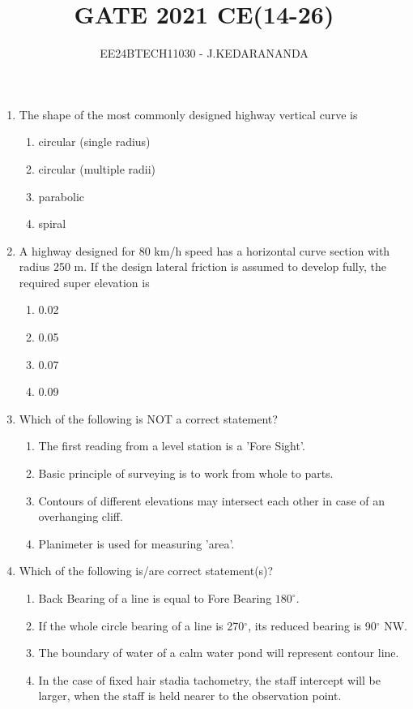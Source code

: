 \documentclass[journal]{IEEEtran}
\renewcommand{\thefigure}{\theenumi}
\renewcommand{\thetable}{\theenumi}
\numberwithin{equation}{enumi}
\numberwithin{figure}{enumi}
\renewcommand{\thetable}{\theenumi}
\begin{document}

\vspace{3cm}

\title{GATE 2021 CE(14-26)}
\author{EE24BTECH11030 - J.KEDARANANDA}
{\let\newpage\relax\maketitle}
\renewcommand{\thefigure}{\theenumi}
\renewcommand{\thetable}{\theenumi}
\begin{enumerate}
\item The shape of the most commonly designed highway vertical curve is
\begin{enumerate}
\item circular (single radius)
\item circular (multiple radii)
\item parabolic
\item spiral
\end{enumerate}

\item A highway designed for 80 km/h speed has a horizontal curve section with radius 250 m. If the design lateral friction is assumed to develop fully, the required super elevation is
\begin{enumerate}
\item 0.02
\item 0.05
\item 0.07
\item 0.09
\end{enumerate} 

\item Which of the following is NOT a correct statement?
\begin{enumerate}
\item The first reading from a level station is a 'Fore Sight'.
\item Basic principle of surveying is to work from whole to parts.
\item Contours of different elevations may intersect each other in case of an overhanging cliff.
\item Planimeter is used for measuring 'area'.
\end{enumerate}


\item Which of the following is/are correct statement(s)?
\begin{enumerate}
\item Back Bearing of a line is equal to Fore Bearing $  180^\circ$.
\item If the whole circle bearing of a line is 270$^\circ$, its reduced bearing is 90$^\circ$ NW.
\item The boundary of water of a calm water pond will represent contour line.
\item In the case of fixed hair stadia tachometry, the staff intercept will be larger, when the staff is held nearer to the observation point.
\end{enumerate}


\end{enumerate}
\end{document}

